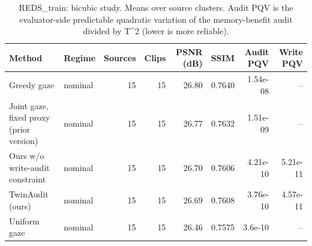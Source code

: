 \begin{table}[t]
\centering
\caption{REDS\_train: bicubic study. Means over source clusters. Audit PQV is the evaluator-side predictable quadratic variation of the memory-benefit audit divided by T^2 (lower is more reliable).}
\label{tab:bicubic_REDS_train}
\small
\begin{tabular}{llrrrrrr}
\toprule
Method & Regime & Sources & Clips & PSNR (dB) & SSIM & Audit PQV & Write PQV \\
\midrule
Greedy gaze & nominal & 15 & 15 & 26.80 & 0.7640 & 1.54e-08 & -- \\
Joint gaze, fixed proxy (prior version) & nominal & 15 & 15 & 26.77 & 0.7632 & 1.51e-09 & -- \\
Ours w/o write-audit constraint & nominal & 15 & 15 & 26.70 & 0.7606 & 4.21e-10 & 5.21e-11 \\
TwinAudit (ours) & nominal & 15 & 15 & 26.69 & 0.7608 & 3.76e-10 & 4.57e-11 \\
Uniform gaze & nominal & 15 & 15 & 26.46 & 0.7575 & 3.6e-10 & -- \\
\bottomrule
\end{tabular}
\end{table}
